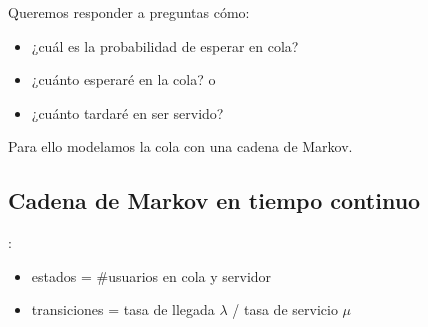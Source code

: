 \documentclass[xcolor={x11names}]{beamer}
\newtheorem{definicion}{Definición}[section]
\begin{document}
\begin{frame}{\secname}
    Queremos responder a preguntas cómo:
    \begin{itemize}
        \item ¿cuál es la probabilidad
            de esperar en cola?
        \item ¿cuánto esperaré en la cola? o
        \item ¿cuánto tardaré en ser servido?
    \end{itemize}

    \vfill

    Para ello modelamos la cola con una
    cadena de Markov.
\end{frame}



\subsection{Cadena de Markov en tiempo continuo}

\begin{frame}{\secname: \subsecname}
    \begin{figure}
        
    \end{figure}

    \begin{figure}
        
    \end{figure}


    \vfill

    \begin{itemize}
        \item estados = \#usuarios en
            cola y servidor
        \item transiciones =
            tasa de llegada $\lambda$ /
            tasa de servicio $\mu$
    \end{itemize}
\end{frame}



\end{document}
